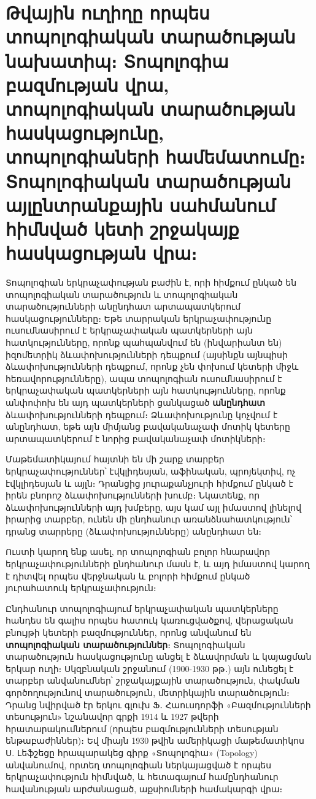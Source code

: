\documentclass[./main.tex]{subfiles}
\begin{document}
\onehalfspacing

\section{Թվային ուղիղը որպես տոպոլո\-գի\-ա\-կան տարա\-ծու\-թյան նախա\-տիպ։ Տո\-պո\-լո\-գիա բազ\-մու\-թյան վրա, տոպո\-լո\-գիա\-կան տարա\-ծու\-թյան հաս\-կա\-ցու\-թյունը, տոպո\-լո\-գիա\-ների համե\-մա\-տումը։ Տոպո\-լո\-գիա\-կան տարա\-ծու\-թյան այլ\-ընտ\-րան\-քա\-յին սահ\-մա\-նում հիմնված կետի շրջա\-կայք հաս\-կա\-ցու\-թյան վրա։}\label{sec:4}

\par Տոպոլոգիան երկրաչափության բաժին է, որի հիմքում ընկած են տոպոլոգիա\-կան տարածություն և տոպոլոգիական տարածությունների անընդհատ արտա\-պատ\-կե\-րում հասկացությունները։ Եթե տարրական երկրաչափությունը ուսումնասիրում է երկ\-րա\-չա\-փական պատկերների այն հատկությունները, որոնք պահպանվում են \linebreak (ին\-վարիանտ են) իզոմետրիկ  ձևափոխությունների դեպքում (այսինքն այնպիսի ձևափոխությունների դեպքում, որոնք չեն փոխում կետերի միջև հեռավորություն\-նե\-րը), ապա տոպոլոգիան ուսումնասիրում է երկրաչափական պատկերների այն հատ\-կու\-թյունները, որոնք անփոփոխ են այդ պատկերների ցանկացած \textbf{անընդհատ} ձևափո\-խու\-թյունների դեպքում։ Ձևափոխությունը կոչվում է անընդհատ, եթե այն միմյանց բավականա\-չափ մոտիկ կետերը արտապատկերում է նորից բավականա\-չափ մոտիկների։

\par Մաթեմատիկայում հայտնի են մի շարք տարբեր երկրաչափություններ՝ էվկ\-լի\-դեսյան, աֆինական, պրոյեկտիվ, ոչ էվկլիդեսյան և այլն։ Դրանցից յուրաքանչյուրի հիմքում ընկած է իրեն բնորոշ ձևափոխությունների խումբ։ Նկատենք, որ ձևափո\-խու\-թյունների այդ խմբերը, այս կամ այլ իմաստով լինելով իրարից տարբեր, ունեն մի ընդհանուր առանձնահատկություն՝ դրանց տար\-րերը (ձևափոխութ\-յունները) \linebreak անընդհատ են։

\par Ուստի կարող ենք ասել, որ տոպոլոգիան բոլոր հնարավոր երկրաչափու\-թյուն\-ների ընդհանուր մասն է, և այդ իմաստով կարող է դիտվել որպես վերջնական և բոլորի հիմքում ընկած յուրահատուկ երկրաչափություն։

\par Ընդհանուր տոպոլոգիայում երկրաչափական պատկերները հանդես են գալիս որ\-պես հատուկ կառուցվածքով, վերացական բնույթի կետերի բազմություններ, \linebreak  որոնց անվանում են \textbf{տոպոլոգիական տարածություններ}։ Տոպոլոգիական տարա\-ծու\-թյուն հասկա\-ցու\-թյունը անցել է ձևավորման և կայացման երկար ուղի։ Սկզբնա\-կան շրջանում (1900-1930 թթ․) այն ունեցել է տարբեր անվանումներ՝ շրջակայքային տարածություն, փակման գործողութ\-յունով տարածություն, մետրիկային տարա\-ծու\-թյուն։ Դրանց նվիրված էր երկու գլուխ Ֆ․ Հաուսդորֆի «Բազմությունների տեսու\-թյուն» նշանա\-վոր գրքի 1914 և 1927 թվերի հրատարակումներում (որպես բազմու\-թյունների տեսու\-թյան ենթաբաժիններ)։ Եվ միայն 1930 թվին ամերիկացի մաթեմա\-տիկոս Ս. Լեֆշեցը հրապարակեց գիրք «Տոպոլոգիա» (Topology) անվանումով, որտեղ տոպոլոգիան ներկայացված է որպես երկրաչա\-փություն հիմնված, և հետա\-գայում համընդհանուր հավանության արժանացած, աքսիոմների համակարգի վրա։
\end{document}

